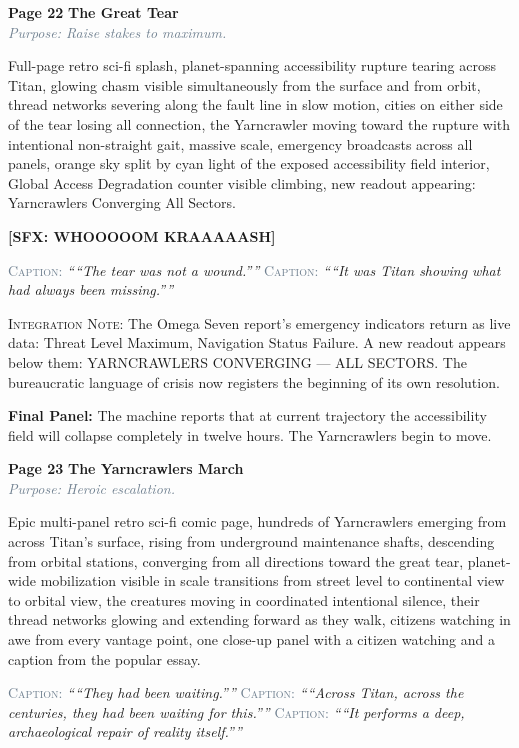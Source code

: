 \documentclass[11pt]{article}
\newcommand{\pagecaption}[1]{\medskip\noindent\textcolor{slateGray}{\textsc{Caption:}} \textit{``#1''}\medskip}
\newcommand{\sfx}[1]{\medskip\noindent\textcolor{warnRed}{\textbf{[SFX: #1]}}\medskip}
\newcommand{\cliffhanger}[1]{\medskip\noindent\textcolor{cyanThread}{\textbf{Final Panel:}} #1\medskip}
\newcommand{\prompt}[1]{\begin{terminal}{\small #1}\end{terminal}}
\newcommand{\integration}[1]{\medskip\noindent\textcolor{archiveGold}{\textsc{Integration Note:}} #1\medskip}
\newcommand{\pageheading}[3]{%
  \begin{pagebox}
    \noindent\textbf{\textcolor{titanOrange}{Page #1}} \hfill \textbf{\textcolor{cyanThread}{#2}}\\[2pt]
    \noindent\textcolor{slateGray}{\textit{Purpose: #3}}
  \end{pagebox}
  \medskip
}
\begin{document}
\vspace{0.5em}

\pageheading{22}{The Great Tear}{Raise stakes to maximum.}

\prompt{Full-page retro sci-fi splash, planet-spanning accessibility rupture tearing across Titan, glowing chasm visible simultaneously from the surface and from orbit, thread networks severing along the fault line in slow motion, cities on either side of the tear losing all connection, the Yarncrawler moving toward the rupture with intentional non-straight gait, massive scale, emergency broadcasts across all panels, orange sky split by cyan light of the exposed accessibility field interior, Global Access Degradation counter visible climbing, new readout appearing: Yarncrawlers Converging All Sectors.}

\sfx{WHOOOOOM KRAAAAASH}

\pagecaption{``The tear was not a wound.''}
\pagecaption{``It was Titan showing what had always been missing.''}

\integration{The Omega Seven report's emergency indicators return as live data: Threat Level Maximum, Navigation Status Failure. A new readout appears below them: YARNCRAWLERS CONVERGING --- ALL SECTORS. The bureaucratic language of crisis now registers the beginning of its own resolution.}

\cliffhanger{The machine reports that at current trajectory the accessibility field will collapse completely in twelve hours. The Yarncrawlers begin to move.}

\vspace{0.5em}

\pageheading{23}{The Yarncrawlers March}{Heroic escalation.}

\prompt{Epic multi-panel retro sci-fi comic page, hundreds of Yarncrawlers emerging from across Titan's surface, rising from underground maintenance shafts, descending from orbital stations, converging from all directions toward the great tear, planet-wide mobilization visible in scale transitions from street level to continental view to orbital view, the creatures moving in coordinated intentional silence, their thread networks glowing and extending forward as they walk, citizens watching in awe from every vantage point, one close-up panel with a citizen watching and a caption from the popular essay.}

\pagecaption{``They had been waiting.''}
\pagecaption{``Across Titan, across the centuries, they had been waiting for this.''}
\pagecaption{``It performs a deep, archaeological repair of reality itself.''}
\end{document}
